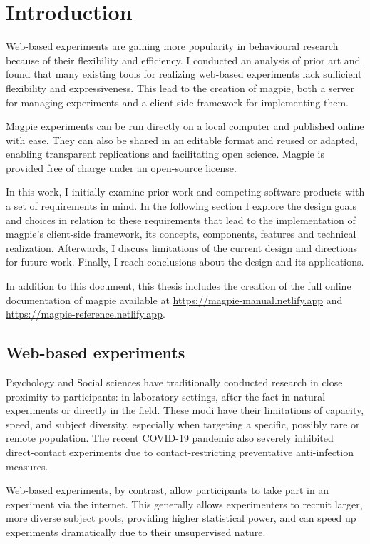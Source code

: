 \documentclass[a4paper,11pt]{scrreprt}
\begin{document}
\tableofcontents
\newpage 


\chapter{Introduction}
Web-based experiments are gaining more popularity in behavioural research because of their flexibility and efficiency. I conducted an analysis of prior art and found that many existing tools for realizing web-based experiments lack sufficient flexibility and expressiveness. This lead to the creation of magpie, both a server for managing experiments and a client-side framework for implementing them.

Magpie experiments can be run directly on a local computer and published online with ease. They can also be shared in an editable format and reused or adapted, enabling transparent replications and facilitating open science. Magpie is provided free of charge under an open-source license.

In this work, I initially examine prior work and competing software products with a set of requirements in mind. In the following section I explore the design goals and choices in relation to these requirements that lead to the implementation of magpie's client-side framework, its concepts, components, features and technical realization. Afterwards, I discuss limitations of the current design and directions for future work. Finally, I reach conclusions about the design and its applications.

In addition to this document, this thesis includes the creation of the full online documentation of magpie available at \url{https://magpie-manual.netlify.app} and \url{https://magpie-reference.netlify.app}.

\section{Web-based experiments}
Psychology and Social sciences have traditionally conducted research in close proximity to participants: in laboratory settings, after the fact in natural experiments or directly in the field. These modi have their limitations of capacity, speed, and subject diversity, especially when targeting a specific, possibly rare or remote population. The recent COVID-19 pandemic also severely inhibited direct-contact experiments due to contact-restricting preventative anti-infection measures.

Web-based experiments, by contrast, allow participants to take part in an experiment via the internet. This generally allows experimenters to recruit larger, more diverse subject pools, providing higher statistical power, and can speed up experiments dramatically due to their unsupervised nature.
\end{document}
